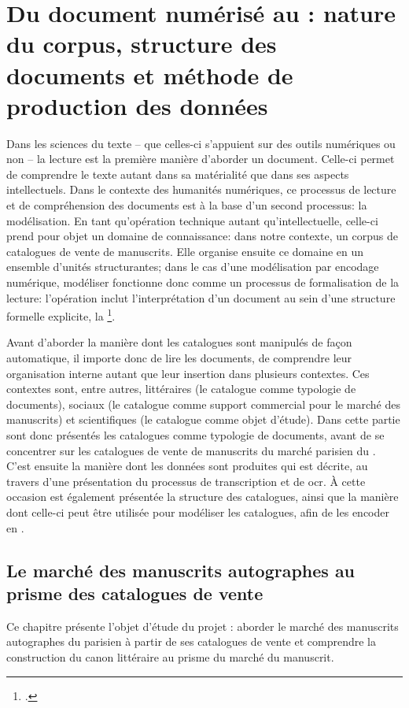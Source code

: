 
\part{Du document numérisé au \xmltei: nature du corpus, structure des documents et méthode de production des données}
Dans les sciences du texte -- que celles-ci s'appuient sur des outils numériques ou non -- la lecture est la première manière d'aborder un document. Celle-ci permet de comprendre le texte autant dans sa matérialité que dans ses aspects intellectuels. Dans le contexte des humanités numériques, ce processus de lecture et de compréhension des documents est à la base d'un second processus: la modélisation. En tant qu'opération technique autant qu'intellectuelle, celle-ci prend pour objet un domaine de connaissance: dans notre contexte, un corpus de catalogues de vente de manuscrits. Elle organise ensuite ce domaine en un ensemble d'unités structurantes; dans le cas d'une modélisation par encodage numérique, modéliser fonctionne donc comme un processus de formalisation de la lecture: l'opération inclut l'interprétation d'un document au sein d'une structure formelle explicite, la \tei{}\footcite[p. 27]{flanders_gentle_2019}.

Avant d'aborder la manière dont les catalogues sont manipulés de façon automatique, il importe donc de lire les documents, de comprendre leur organisation interne autant que leur insertion dans plusieurs contextes. Ces contextes sont, entre autres, littéraires (le catalogue comme typologie de documents), sociaux (le catalogue comme support commercial pour le marché des manuscrits) et scientifiques (le catalogue comme objet d'étude). Dans cette partie sont donc présentés les catalogues comme typologie de documents, avant de se concentrer sur les catalogues de vente de manuscrits du marché parisien du . C'est ensuite la manière dont les données sont produites qui est décrite, au travers d'une présentation du processus de transcription et de \gls{ocr}. À cette occasion est également présentée la structure des catalogues, ainsi que la manière dont celle-ci peut être utilisée pour modéliser les catalogues, afin de les encoder en \xmltei{}.

\chapter{Le marché des manuscrits autographes au prisme des catalogues de vente}
Ce chapitre présente l'objet d'étude du projet \mss{} : aborder le marché des manuscrits autographes du  parisien à partir de ses catalogues de vente et comprendre la construction du canon littéraire au prisme du marché du manuscrit.

